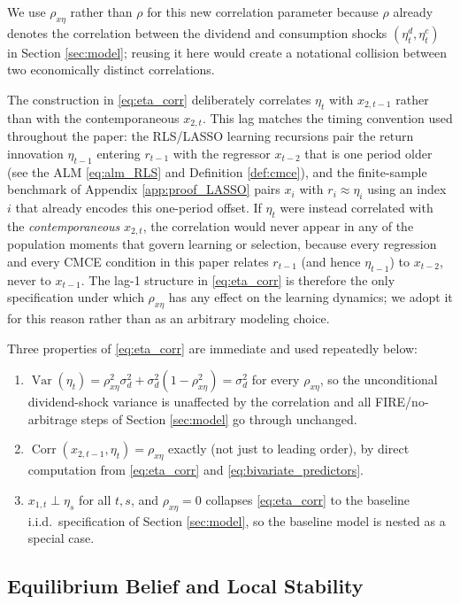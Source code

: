 We use $\rho_{x\eta}$ rather than $\rho$ for this new correlation parameter because $\rho$ already denotes the correlation between the dividend and consumption shocks $(\eta^d_t,\eta^c_t)$ in Section \ref{sec:model}; reusing it here would create a notational collision between two economically distinct correlations.

The construction in \eqref{eq:eta_corr} deliberately correlates $\eta_t$ with $x_{2,t-1}$ rather than with the contemporaneous $x_{2,t}$. This lag matches the timing convention used throughout the paper: the RLS/LASSO learning recursions pair the return innovation $\eta_{t-1}$ entering $r_{t-1}$ with the regressor $x_{t-2}$ that is one period older (see the ALM \eqref{eq:alm_RLS} and Definition \ref{def:cmce}), and the finite-sample benchmark of Appendix \ref{app:proof_LASSO} pairs $x_i$ with $r_i\approx\eta_i$ using an index $i$ that already encodes this one-period offset. If $\eta_t$ were instead correlated with the \emph{contemporaneous} $x_{2,t}$, the correlation would never appear in any of the population moments that govern learning or selection, because every regression and every CMCE condition in this paper relates $r_{t-1}$ (and hence $\eta_{t-1}$) to $x_{t-2}$, never to $x_{t-1}$. The lag-1 structure in \eqref{eq:eta_corr} is therefore the only specification under which $\rho_{x\eta}$ has any effect on the learning dynamics; we adopt it for this reason rather than as an arbitrary modeling choice.

Three properties of \eqref{eq:eta_corr} are immediate and used repeatedly below:
\begin{enumerate}
\item $\operatorname{Var}(\eta_t)=\rho_{x\eta}^2\sigma_d^2+\sigma_d^2(1-\rho_{x\eta}^2)=\sigma_d^2$ for every $\rho_{x\eta}$, so the unconditional dividend-shock variance is unaffected by the correlation and all FIRE/no-arbitrage steps of Section \ref{sec:model} go through unchanged.
\item $\operatorname{Corr}(x_{2,t-1},\eta_t)=\rho_{x\eta}$ exactly (not just to leading order), by direct computation from \eqref{eq:eta_corr} and \eqref{eq:bivariate_predictors}.
\item $x_{1,t}\perp \eta_s$ for all $t,s$, and $\rho_{x\eta}=0$ collapses \eqref{eq:eta_corr} to the baseline i.i.d.\ specification of Section \ref{sec:model}, so the baseline model is nested as a special case.
\end{enumerate}

\subsection{Equilibrium Belief and Local Stability}

